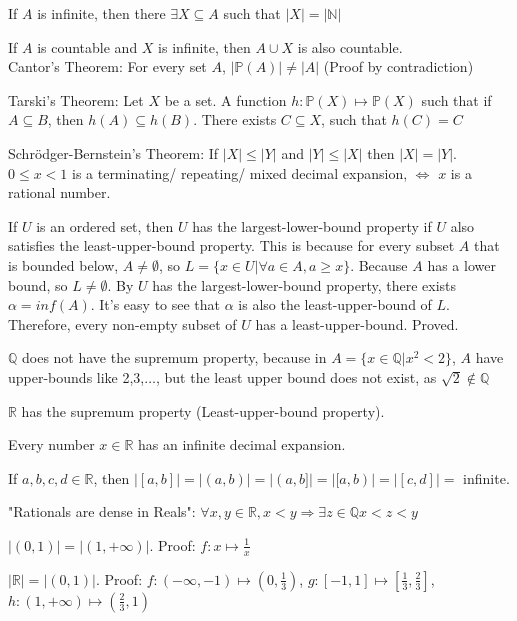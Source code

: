 \documentclass[12pt,a4paper]{ctexrep}
\begin{document}
If $A$ is infinite, then there $\exists X \subseteq A$ such that $|X| = |\mathbb{N}|$

If $A$ is countable and $X$ is infinite, then $A \cup X$ is also countable.\\

Cantor's Theorem:
For every set $A$, $|\mathbb{P}(A)| \neq |A|$ (Proof by contradiction)

Tarski's Theorem:
Let $X$ be a set. A function $h: \mathbb{P}(X)\mapsto \mathbb{P}(X)$ such that if $A \subseteq B$, then $h(A) \subseteq h(B)$. There exists $C \subseteq X$, such that $h(C)=C$

Schr\"odger-Bernstein's Theorem:
If $|X| \leqslant |Y|$ and $|Y| \leqslant |X|$ then $|X| = |Y|$.\\

$0\leqslant x < 1$ is a terminating/ repeating/ mixed decimal expansion, $\iff$ $x$ is a rational number.

If $U$ is an ordered set, then $U$ has the largest-lower-bound property if $U$ also satisfies the least-upper-bound property. This is because for every subset $A$ that is bounded below, $A \neq \emptyset$, so $L = \{x \in U| \forall a \in A, a \geq x\}$. Because $A$ has a lower bound, so $L \neq \emptyset$. By $U$ has the largest-lower-bound property, there exists $\alpha = inf(A)$. It's easy to see that $\alpha$ is also the least-upper-bound of $L$. Therefore, every non-empty subset of $U$ has a least-upper-bound. Proved.

$\mathbb{Q}$ does not have the supremum property, because in $A=\{x \in \mathbb{Q}| x^2<2\}$, $A$ have upper-bounds like 2,3,$\dots$, but the least upper bound does not exist, as $\sqrt{2} \notin \mathbb{Q}$

$\mathbb{R}$ has the supremum property (Least-upper-bound property).

Every number $x\in \mathbb{R}$ has an infinite decimal expansion.

If $a,b,c,d \in \mathbb{R}$, then $|[a,b]| = |(a,b)| = |(a,b]| = |[a,b)| = |[c,d]| = $ infinite.

"Rationals are dense in Reals": $\forall x,y \in \mathbb{R}, x<y \Rightarrow \exists z \in \mathbb{Q} x<z<y$

$|(0,1)| = |(1,+\infty)|$. Proof: $f: x \mapsto \frac{1}{x}$

$|\mathbb{R}| = |(0,1)|$. Proof: $f: (-\infty,-1)\mapsto(0,\frac{1}{3})$, $g: [-1,1]\mapsto[\frac{1}{3},\frac{2}{3}]$, $h: (1,+\infty)\mapsto(\frac{2}{3},1)$
\end{document}
